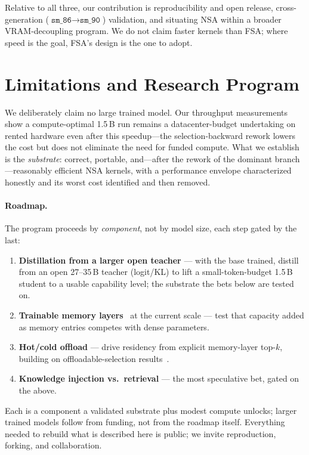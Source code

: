 \documentclass[11pt]{article}
\begin{document}
Relative to all three, our contribution is reproducibility and open release, cross-generation
($\texttt{sm\_86}\to\texttt{sm\_90}$) validation, and situating NSA within a broader VRAM-decoupling
program. We do not claim faster kernels than FSA; where speed is the goal, FSA's design is the one to
adopt.

\section{Limitations and Research Program}
We deliberately claim no large trained model. Our throughput measurements show a compute-optimal
1.5\,B run remains a datacenter-budget undertaking on rented hardware even after this
speedup---the selection-backward rework lowers the cost but does not eliminate the need for funded
compute. What we establish is the \emph{substrate}: correct, portable, and---after the rework of the
dominant branch---reasonably efficient NSA kernels, with a performance envelope characterized
honestly and its worst cost identified and then removed.

\paragraph{Roadmap.} The program proceeds by \emph{component}, not by model size, each step gated by
the last:
\begin{enumerate}[leftmargin=1.4em,itemsep=2pt]
\item \textbf{Distillation from a larger open teacher} --- with the base trained, distill from an
open 27--35\,B teacher (logit/KL) to lift a small-token-budget 1.5\,B student to a usable capability
level; the substrate the bets below are tested on.
\item \textbf{Trainable memory layers}~\cite{memlayers} at the current scale --- test that capacity
added as memory entries competes with dense parameters.
\item \textbf{Hot/cold offload} --- drive residency from explicit memory-layer top-$k$, building on
offloadable-selection results~\cite{nosa}.
\item \textbf{Knowledge injection vs.\ retrieval} --- the most speculative bet, gated on the above.
\end{enumerate}
Each is a component a validated substrate plus modest compute unlocks; larger trained models follow
from funding, not from the roadmap itself. Everything needed to rebuild what is described here is
public; we invite reproduction, forking, and collaboration.
\end{document}
